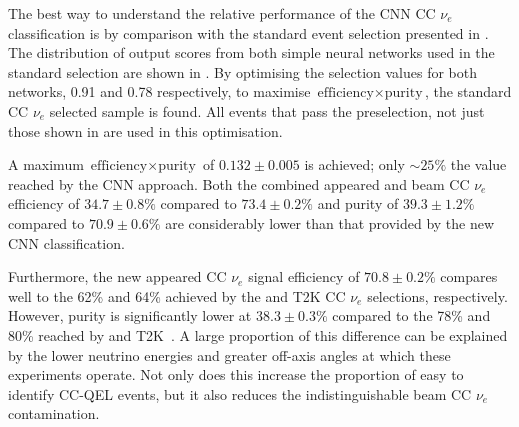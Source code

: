 The best way to understand the relative performance of the CNN CC $\nu_{e}$ classification is by
comparison with the standard event selection presented in . The
distribution of output scores from both simple neural networks used in the standard selection are
shown in . By optimising the selection values for both
networks, 0.91 and 0.78 respectively, to maximise $\text{efficiency}\times\text{purity}$, the
standard CC $\nu_{e}$ selected sample is found. All events that pass the preselection, not just
those shown in  are used in this optimisation.

A maximum $\text{efficiency}\times\text{purity}$ of $0.132\pm0.005$ is achieved; only $\sim25\%$
the value reached by the CNN approach. Both the combined appeared and beam CC $\nu_{e}$ efficiency
of $34.7\pm0.8\%$ compared to $73.4\pm0.2\%$ and purity of $39.3\pm1.2\%$ compared to
$70.9\pm0.6\%$ are considerably lower than that provided by the new CNN classification.

Furthermore, the new appeared CC $\nu_{e}$ signal efficiency of $70.8\pm0.2\%$ compares well to
the 62\% and 64\% achieved by the \nova and T2K CC $\nu_{e}$ selections, respectively. However,
purity is significantly lower at $38.3\pm0.3\%$ compared to the 78\% and 80\% reached by \nova and
T2K~\cite{acero2019, abe2015}. A large proportion of this difference can be explained by the lower
neutrino energies and greater off-axis angles at which these experiments operate. Not only does
this increase the proportion of easy to identify CC-QEL events, but it also reduces the
indistinguishable beam CC $\nu_{e}$ contamination.

